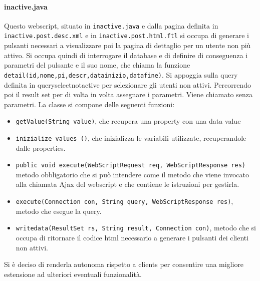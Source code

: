 \paragraph{inactive.java}
Questo webscript, situato in \texttt{inactive.java} e dalla pagina definita in \texttt{inactive.post.desc.xml} e in \texttt{inactive.post.html.ftl} si occupa di generare i pulsanti necessari a visualizzare poi la pagina di dettaglio per un utente non più attivo. Si occupa quindi di interrogare il database e di definire di conseguenza i parametri del pulsante e il suo nome, che chiama la funzione \texttt{detail(id,nome,pi,descr,datainizio,datafine)}. Si appoggia sulla query definita in queryselectnotactive per selezionare gli utenti non attivi. Percorrendo poi il result set per di volta in volta assegnare i parametri.
Viene chiamato senza parametri.
La classe si compone delle seguenti funzioni:
\begin{itemize}
\item \texttt{getValue(String value)}, che recupera una property con una data value
\item \texttt{inizialize\_values ()}, che inizializza le variabili utilizzate, recuperandole dalle properties.
\item \texttt{public void execute(WebScriptRequest req, WebScriptResponse res)} metodo obbligatorio che si può intendere come il metodo che viene invocato alla chiamata Ajax del webscript e che contiene le istruzioni per gestirla.
\item \texttt{execute(Connection con, String query, WebScriptResponse res)}, metodo che esegue la query.
\item \texttt{writedata(ResultSet rs, String result, Connection con)}, metodo che si occupa di ritornare il codice html necessario a generare i pulsanti dei clienti non attivi.
\end{itemize}
Si è deciso di renderla autonoma rispetto a clients per consentire una migliore estensione ad ulteriori eventuali funzionalità.
